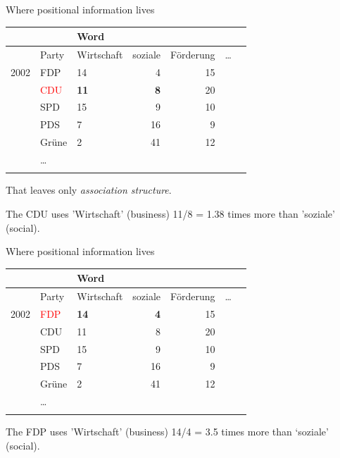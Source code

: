\documentclass{hertieteaching}
\begin{document}
\begin{frame}{Where positional information lives}

\begin{center}{\footnotesize
\begin{tabular}{lllrrrr}\toprule
      &            &        Word \\ \midrule
      &     Party  &  Wirtschaft & soziale & Förderung & \ldots \\ \midrule
2002  &     FDP       &      {14} &      {4} &        15 & \\
      &     \textcolor{red}{CDU}       &      \textbf{11} &      \textbf{8} &        20 & \\
      &     SPD       &       15 &       9 &        10 & \\
      &     PDS       &        7 &      16 &         9 & \\
      &     Grüne     &        2 &      41 &        12 & \\
      &     \ldots \\ \bottomrule
\label{fragment}
\end{tabular}}\end{center}

That leaves only \textit{association structure}.

\pause

The CDU uses 'Wirtschaft' (business) 11/8 = 1.38 times more than 'soziale' (social).
\end{frame}

\begin{frame}{Where positional information lives}

\begin{center}{\footnotesize
\begin{tabular}{lllrrrr}\toprule
      &            &        Word \\ \midrule
      &     Party  &  Wirtschaft & soziale & Förderung & \ldots \\ \midrule
2002  &     \textcolor{red}{FDP} &      \textbf{14} &       \textbf{4} &        15 & \\
      &     CDU       &      {11} &      {8} &        20 & \\
      &     SPD       &       15 &       9 &        10 & \\
      &     PDS       &        7 &      16 &         9 & \\
      &     Grüne     &        2 &      41 &        12 & \\
      &     \ldots \\ \bottomrule
\label{fragment}
\end{tabular}}\end{center}

The FDP uses 'Wirtschaft' (business) 14/4 = 3.5 times more than `soziale' (social). 
\end{frame}
\end{document}
